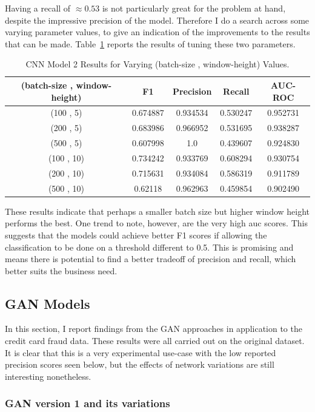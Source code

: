 \documentclass[12pt,a4paper,twoside]{report}
\begin{document}
Having a recall of $ \approx0.53 $ is not particularly great for the problem at hand, despite the impressive precision of the model. Therefore I do a search across some varying parameter values, to give an indication of the improvements to the results that can be made. Table~\ref{table:cnnv2-results-tuning} reports the results of tuning these two parameters.

\begin{table}[H]  
  \centering
  \begin{tabular}{ccccc}
    \toprule
     (batch-size , window-height) & F1 & Precision & Recall & AUC-ROC \\ \midrule
    (100 , 5) & 0.674887 & 0.934534 & 0.530247 & 0.952731  \\
    (200 , 5) & 0.683986 & 0.966952 & 0.531695 & 0.938287 \\
    (500 , 5) & 0.607998 &1.0 & 0.439607 & 0.924830 \\
    (100 , 10) & 0.734242 & 0.933769 & 0.608294 & 0.930754 \\
    (200 , 10) & 0.715631 & 0.934084 & 0.586319 & 0.911789 \\
    (500 , 10) & 0.62118 & 0.962963 & 0.459854 & 0.902490\\
   \bottomrule
 \end{tabular}
 \caption{CNN Model 2 Results for Varying (batch-size , window-height) Values.}
\label{table:cnnv2-results-tuning}
\end{table}

These results indicate that perhaps a smaller batch size but higher window height performs the best. One trend to note, however, are the very high auc scores. This suggests that the models could achieve better F1 scores if allowing the classification to be done on a threshold different to 0.5. This is promising and means there is potential to find a better tradeoff of precision and recall, which better suits the business need.

\subsection{GAN Models}
In this section, I report findings from the GAN approaches in application to the credit card fraud data. These results were all carried out on the original dataset. It is clear that this is a very experimental use-case with the low reported precision scores seen below, but the effects of network variations are still interesting nonetheless.

\subsubsection{GAN version 1 and its variations}
\end{document}
